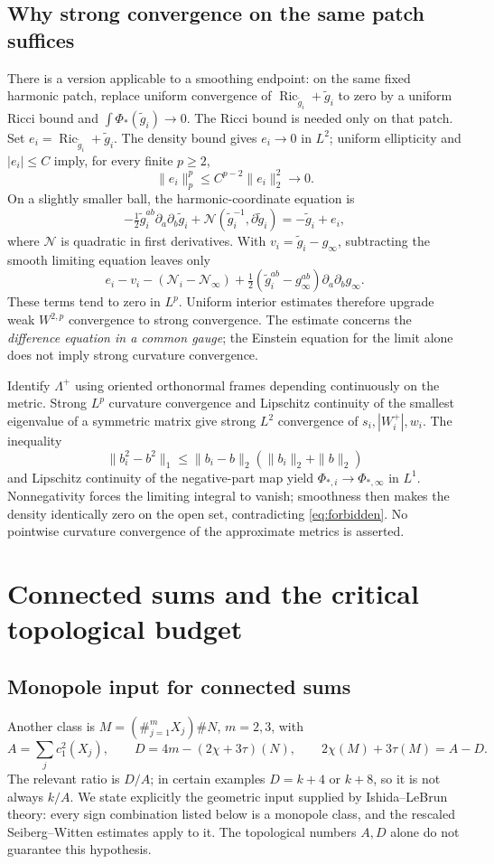 \documentclass[a4paper,11pt]{article}
\numberwithin{equation}{section}
\theoremstyle{definition}
\newcommand{\Ric}{\operatorname{Ric}}
\begin{document}
\subsection{Why strong convergence on the same patch suffices}\label{sec:strong-density-bridge}
There is a version applicable to a smoothing endpoint: on the same fixed harmonic patch, replace uniform convergence of
$\Ric_{\widetilde g_i}+\widetilde g_i$ to zero by a uniform Ricci bound and
$\int\Phi_*(\widetilde g_i)\to0$.
The Ricci bound is needed only on that patch. Set
$e_i=\Ric_{\widetilde g_i}+\widetilde g_i$. The density bound gives $e_i\to0$ in $L^2$;
uniform ellipticity and $|e_i|\le C$ imply, for every finite $p\ge2$,
\[
\|e_i\|_p^p\le C^{p-2}\|e_i\|_2^2\longrightarrow0.
\]
On a slightly smaller ball, the harmonic-coordinate equation is
\[
-\tfrac12\widetilde g_i^{ab}\partial_a\partial_b\widetilde g_i
 +\mathcal N(\widetilde g_i^{-1},\partial\widetilde g_i)
=-\widetilde g_i+e_i,
\]
where $\mathcal N$ is quadratic in first derivatives. With $v_i=\widetilde g_i-g_\infty$,
subtracting the smooth limiting equation leaves only
\[
e_i-v_i-(\mathcal N_i-\mathcal N_\infty)
 +\tfrac12(\widetilde g_i^{ab}-g_\infty^{ab})\partial_a\partial_bg_\infty.
\]
These terms tend to zero in $L^p$. Uniform interior estimates therefore upgrade weak $W^{2,p}$ convergence to strong convergence.
The estimate concerns the \emph{difference equation in a common gauge}; the Einstein equation for the limit alone does not imply strong curvature convergence.

Identify $\Lambda^+$ using oriented orthonormal frames depending continuously on the metric.
Strong $L^p$ curvature convergence and Lipschitz continuity of the smallest eigenvalue of a symmetric matrix give strong $L^2$ convergence of
$s_i,|W_i^+|,w_i$. The inequality
\[
\|b_i^2-b^2\|_1\le\|b_i-b\|_2(\|b_i\|_2+\|b\|_2)
\]
and Lipschitz continuity of the negative-part map yield $\Phi_{*,i}\to\Phi_{*,\infty}$ in $L^1$.
Nonnegativity forces the limiting integral to vanish; smoothness then makes the density identically zero on the open set, contradicting \eqref{eq:forbidden}.
No pointwise curvature convergence of the approximate metrics is asserted.

\section{Connected sums and the critical topological budget}
\subsection{Monopole input for connected sums}
Another class is $M=(\#_{j=1}^{m}X_j)\#N$, $m=2,3$, with
\[
A=\sum_j c_1^2(X_j),\qquad D=4m-(2\chi+3\tau)(N),\qquad
2\chi(M)+3\tau(M)=A-D.
\]
The relevant ratio is $D/A$; in certain examples $D=k+4$ or $k+8$, so it is not always $k/A$. We state explicitly the geometric input supplied by Ishida--LeBrun theory\cite{IL}: every sign combination listed below is a monopole class, and the rescaled Seiberg--Witten estimates apply to it. The topological numbers $A,D$ alone do not guarantee this hypothesis.
\end{document}

